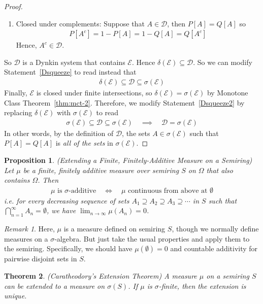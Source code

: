 \documentclass[12pt]{article}
\theoremstyle{plain}
\newtheorem{thm}{Theorem}[section]
\newtheorem{prop}[thm]{Proposition}
\theoremstyle{definition}
\theoremstyle{remark}
\newtheorem*{rmk}{Remark}
\newcommand{\limn}{\lim_{n\rightarrow\infty}}
\newcommand{\sE}{\mathscr{E}}
\newcommand{\sD}{\mathscr{D}}
\newcommand{\ninf}{_{n=1}^\infty}
\begin{document}
\begin{proof}
\begin{enumerate}
  \item Closed under complements: Suppose that $A\in \sD$, then
    $P[A]=Q[A]$ so
    \begin{align*}
      P[A^c] = 1 - P[A]
      = 1-Q[A] = Q[A^c]
    \end{align*}
    Hence, $A^c\in\sD$.
\end{enumerate}
So $\sD$ is a Dynkin system that contains $\sE$. Hence
$\delta(\sE)\subseteq\sD$. So we can modify Statement~\ref{Dsqueeze} to
read instead that
\begin{align}
  \delta(\sE) \subseteq \sD \subseteq \sigma(\sE)
  \label{Dsqueeze2}
\end{align}
Finally, $\sE$ is closed under finite intersections, so
$\delta(\sE)=\sigma(\sE)$ by Monotone Class Theorem~\ref{thm:mct-2}.
Therefore, we modify Statement~\ref{Dsqueeze2} by replacing
$\delta(\sE)$ with $\sigma(\sE)$ to read
\begin{align}
  \sigma(\sE) \subseteq \sD \subseteq \sigma(\sE)
  \quad\implies\quad
  \sD=\sigma(\sE)
  \label{Dsqueeze3}
\end{align}
In other words, by the definition of $\sD$, the sets $A\in \sigma(\sE)$
such that $P[A]=Q[A]$ is \emph{all of the sets} in $\sigma(\sE)$.
\end{proof}

\begin{prop}
\emph{(Extending a Finite, Finitely-Additive Measure on a Semiring)}
Let $\mu$ be a finite, finitely additive measure over semiring $S$ on
$\Omega$ that also contains $\Omega$. Then
\begin{align*}
  \text{$\mu$ is $\sigma$-additive}
  \quad\iff\quad
  \text{$\mu$ continuous from above at $\emptyset$}
\end{align*}
i.e.  for every decreasing sequence of sets
$A_1\supseteq A_2\supseteq A_3\supseteq \cdots$ in $S$ such that
$\bigcap\ninf A_n =\emptyset$, we have $\limn \mu(A_n)=0$.
\end{prop}
\begin{rmk}
Here, $\mu$ is a measure defined on semiring $S$, though we normally
define measures on a $\sigma$-algebra. But just take the usual
properties and apply them to the semiring. Specifically, we should have
$\mu(\emptyset)=0$ and countable additivity for pairwise disjoint sets
in $S$.
\end{rmk}

\begin{thm}\emph{(Caratheodory's Extension Theorem)}
\label{thm:cara}
A measure $\mu$ on a semiring $S$ can be extended to a measure on
$\sigma(S)$. If $\mu$ is $\sigma$-finite, then the extension is unique.
\end{thm}
\end{document}
